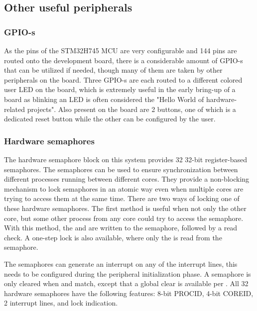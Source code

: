 \subsection{Other useful peripherals}

\subsubsection{GPIO-s}

As the pins of the STM32H745 MCU are very configurable and 144 pins are routed onto the development board, there is a considerable amount of GPIO-s that can be utilized if needed, though many of them are taken by other peripherals on the board. Three GPIO-s are each routed to a different colored user LED on the board, which is extremely useful in the early bring-up of a board as blinking an LED is often considered the "Hello World of hardware-related projects". Also present on the board are 2 buttons, one of which is a dedicated reset button while the other can be configured by the user.

\subsubsection{Hardware semaphores}

The hardware semaphore block on this system provides 32 32-bit register-based semaphores. The semaphores can be used to ensure synchronization between different processes running between different cores. They provide a non-blocking mechanism to lock semaphores in an atomic way even when multiple cores are trying to access them at the same time. There are two ways of locking one of these hardware semaphores. The first method is useful when not only the other core, but some other process from any core could try to access the semaphore. With this method, the  and  are written to the semaphore, followed by a read check. A one-step lock is also available, where only the  is read from the semaphore.

The semaphores can generate an interrupt on any of the interrupt lines, this needs to be configured during the peripheral initialization phase. A semaphore is only cleared when  and  match, except that a global clear is available per . All 32 hardware semaphores have the following features: 8-bit PROCID, 4-bit COREID, 2 interrupt lines, and lock indication.

